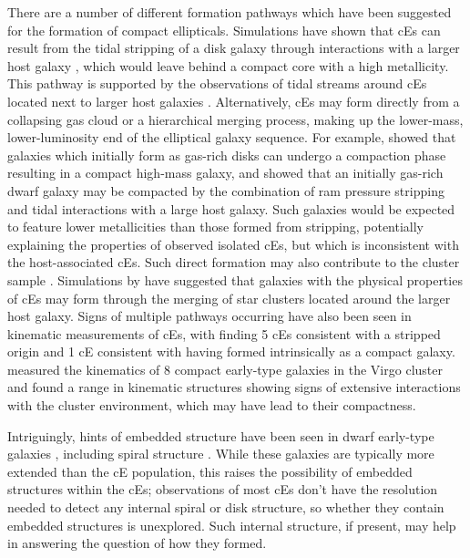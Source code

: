 \documentclass[a4paper,fleqn,usenatbib]{mnras}
\begin{document}
There are a number of different formation pathways which have been suggested for the formation of compact ellipticals. Simulations have shown that cEs can result from the tidal stripping of a disk galaxy through interactions with a larger host galaxy \citep{2001ApJ...557L..39B}, which would leave behind a compact core with a high metallicity. This pathway is supported by the observations of tidal streams around cEs located next to larger host galaxies \citep{2011MNRAS.414.3557H,2014ApJ...796L..14P}. Alternatively, cEs may form directly from a collapsing gas cloud or a hierarchical merging process, making up the lower-mass, lower-luminosity end of the elliptical galaxy sequence. For example, \citet{2015MNRAS.450.2327Z} showed that galaxies which initially form as gas-rich disks can undergo a compaction phase resulting in a compact high-mass galaxy, and \citet{2019ApJ...875...58D} showed that an initially gas-rich dwarf galaxy may be compacted by the combination of ram pressure stripping and tidal interactions with a large host galaxy. Such galaxies would be expected to feature lower metallicities than those formed from stripping, potentially explaining the properties of observed isolated cEs, but which is inconsistent with the host-associated cEs. Such direct formation may also contribute to the cluster sample \citep{2017MNRAS.470.4015M}. Simulations by \citep{2019MNRAS.489.2746U} have suggested that galaxies with the physical properties of cEs may form through the merging of star clusters located around the larger host galaxy. Signs of multiple pathways occurring have also been seen in kinematic measurements of cEs, with \citet{2021MNRAS.503.5455F} finding 5 cEs consistent with a stripped origin and 1 cE consistent with having formed intrinsically as a compact galaxy. \citet{2015ApJ...804...70G} measured the kinematics of 8 compact early-type galaxies in the Virgo cluster and found a range in kinematic structures showing signs of extensive interactions with the cluster environment, which may have lead to their compactness.

Intriguingly, hints of embedded structure have been seen in dwarf early-type galaxies \citep{2021A&A...647A.100S}, including spiral structure \citep{2000A&A...358..845J, 2021ApJ...912..149S}. While these galaxies are typically more extended than the cE population, this raises the possibility of embedded structures within the cEs;  observations of most cEs don't have the resolution needed to detect any internal spiral or disk structure, so whether they contain embedded structures is unexplored. Such internal structure, if present, may help in answering the question of how they formed. 
\end{document}
